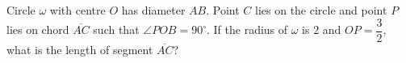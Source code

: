 Circle $\omega$ with centre $O$ has diameter $AB$. Point $C$ lies on the circle and point $P$ lies on chord $\overline{AC}$ such that $\angle POB=90^\circ$. If the radius of $\omega$ is $2$ and $OP=\dfrac{3}{2}$, what is the length of segment $\overline{AC}$?
